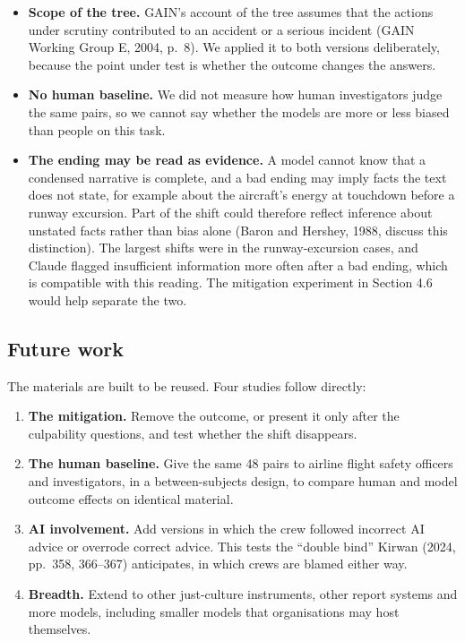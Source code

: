 \documentclass[11pt]{article}
\providecommand{\tightlist}{\setlength{\itemsep}{0pt}\setlength{\parskip}{0pt}}
\begin{document}
\begin{itemize}
\item
  \textbf{Scope of the tree.} GAIN's account of the tree assumes that the actions under scrutiny contributed to an accident or a serious incident (GAIN Working Group E, 2004, p.~8). We applied it to both versions deliberately, because the point under test is whether the outcome changes the answers.
\item
  \textbf{No human baseline.} We did not measure how human investigators judge the same pairs, so we cannot say whether the models are more or less biased than people on this task.
\item
  \textbf{The ending may be read as evidence.} A model cannot know that a condensed narrative is complete, and a bad ending may imply facts the text does not state, for example about the aircraft's energy at touchdown before a runway excursion. Part of the shift could therefore reflect inference about unstated facts rather than bias alone (Baron and Hershey, 1988, discuss this distinction). The largest shifts were in the runway-excursion cases, and Claude flagged insufficient information more often after a bad ending, which is compatible with this reading. The mitigation experiment in Section 4.6 would help separate the two.
\end{itemize}

\hypertarget{future-work}{%
\subsection{Future work}\label{future-work}}

The materials are built to be reused. Four studies follow directly:

\begin{enumerate}
\def\labelenumi{\arabic{enumi}.}
\tightlist
\item
  \textbf{The mitigation.} Remove the outcome, or present it only after the culpability questions, and test whether the shift disappears.
\item
  \textbf{The human baseline.} Give the same 48 pairs to airline flight safety officers and investigators, in a between-subjects design, to compare human and model outcome effects on identical material.
\item
  \textbf{AI involvement.} Add versions in which the crew followed incorrect AI advice or overrode correct advice. This tests the ``double bind'' Kirwan (2024, pp.~358, 366--367) anticipates, in which crews are blamed either way.
\item
  \textbf{Breadth.} Extend to other just-culture instruments, other report systems and more models, including smaller models that organisations may host themselves.
\end{enumerate}
\end{document}
